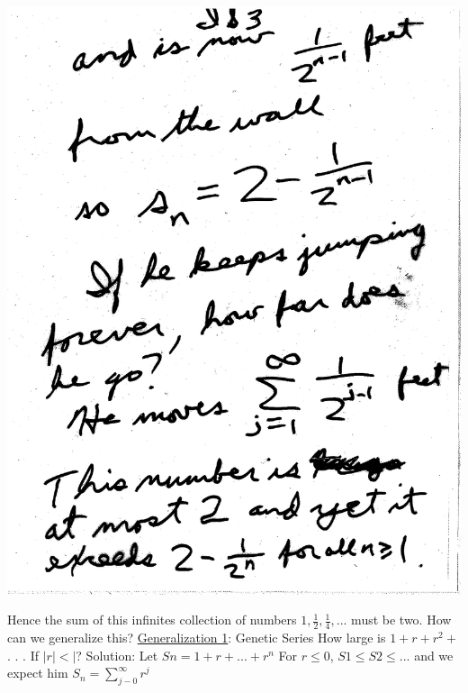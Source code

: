 \documentclass[10pt,a4paper]{article}
\begin{document}
\includegraphics[scale=.5]{Pages/IS_3}

\newpage

Hence the sum of this infinites collection of numbers ${1, \frac{1}{2}, \frac{1}{4}, . . .}$ must be two. How can we generalize this? 
\underline {Generalization 1}: Genetic Series 
How large is $1+r+r^{2}+$ . . . If $|r|<|$? Solution: Let $S{n}= 1+r+...+r^{n}$ For $r\leq 0$, $S{1}\leq S{2}\leq ...$ and we expect him $S_{n}=\sum_{j-0}^{\infty} {r^{j}}$ 
\end{document}
